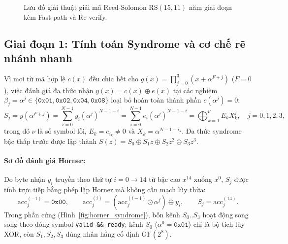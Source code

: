 \begin{figure}[!htb]
\caption{Lưu đồ giải thuật giải mã Reed-Solomon $\text{RS}(15,11)$ năm giai đoạn kèm Fast-path và Re-verify.}
\label{fig:rs_decode_flow}
\end{figure}

\subsection{Giai đoạn 1: Tính toán Syndrome và cơ chế rẽ nhánh nhanh}

Vì mọi từ mã hợp lệ $c(x)$ đều chia hết cho $g(x) = \prod_{j=0}^{3}(x + \alpha^{F+j})$ ($F = 0$), việc đánh giá đa thức nhận $y(x) = c(x) \oplus e(x)$ tại các nghiệm $\beta_j = \alpha^j \in \{\texttt{0x01}, \texttt{0x02}, \texttt{0x04}, \texttt{0x08}\}$ loại bỏ hoàn toàn thành phần $c(\alpha^j) = 0$:
\begin{equation}
S_j = y(\alpha^{F+j}) = \sum_{i=0}^{N-1} y_i \left(\alpha^j\right)^{N-1-i} = \sum_{i=0}^{N-1} e_i \left(\alpha^j\right)^{N-1-i} = \bigoplus_{k=1}^{\nu} E_k X_k^j, \quad j = 0, 1, 2, 3,
\label{eq:syndrome_def}
\end{equation}
trong đó $\nu$ là số symbol lỗi, $E_k = e_{i_k} \neq 0$ và $X_k = \alpha^{N-1-i_k}$. Đa thức syndrome bậc thấp trước được lập thành $S(z) = S_0 \oplus S_1 z \oplus S_2 z^2 \oplus S_3 z^3$.

\paragraph{Sơ đồ đánh giá Horner:}
Do byte nhận $y_i$ truyền theo thứ tự $i = 0 \to 14$ từ bậc cao $x^{14}$ xuống $x^0$, $S_j$ được tính trực tiếp bằng phép lặp Horner mà không cần mạch lũy thừa:
\begin{equation}
\text{acc}_j^{(-1)} = \texttt{0x00}, \qquad \text{acc}_j^{(i)} = \left(\text{acc}_j^{(i-1)} \odot \alpha^j\right) \oplus y_i, \qquad S_j = \text{acc}_j^{(14)}.
\label{eq:horner_step}
\end{equation}
Trong phần cứng (Hình~\ref{fig:horner_syndrome}), bốn kênh $S_0..S_3$ hoạt động song song theo dòng symbol \texttt{valid \&\& ready}; kênh $S_0$ ($\alpha^0 = \texttt{0x01}$) chỉ là bộ tích lũy XOR, còn $S_1, S_2, S_3$ dùng nhân hằng cố định $\text{GF}(2^8)$.

